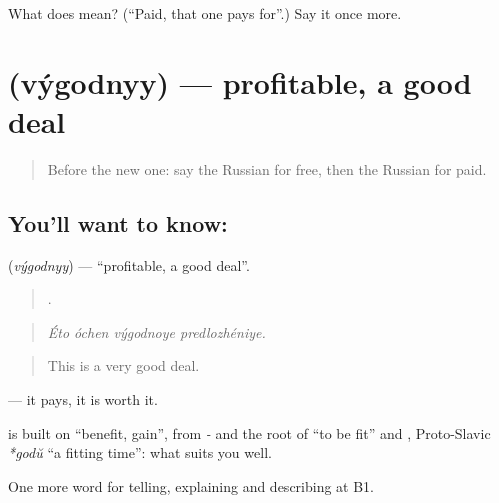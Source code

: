 \begin{tcolorbox}[breakable,colback=teal!4,colframe=teal!35!black,title={Before you move on}]
What does  mean? (\textquotedblleft{}Paid, that one pays for\textquotedblright{}.) Say it once more.
\end{tcolorbox}
\section[\texorpdfstring{\ru{выгодный} (výgodnyy)}{выгодный (výgodnyy)}]{ (výgodnyy) — profitable, a good deal}

\label{lesson:RU-C397-vygodnyy}



\begin{quote}
Before the new one: say the Russian for free, then the Russian for paid.
\end{quote}

\subsection*{You'll want to know: }
\textbf{} (\emph{výgodnyy}) — \textquotedblleft{}profitable, a good deal\textquotedblright{}.

\begin{quote}
   .
\end{quote}

\begin{quote}
\emph{Éto óchen výgodnoye predlozhéniye.}
\end{quote}

\begin{quote}
This is a very good deal.
\end{quote}

\emph{} — it pays, it is worth it.

\begin{cousinweb}
\textbf{} is built on \emph{} \textquotedblleft{}benefit, gain\textquotedblright{}, from \emph{-} and the root of \emph{} \textquotedblleft{}to be fit\textquotedblright{} and \emph{}, Proto-Slavic \emph{*godŭ} \textquotedblleft{}a fitting time\textquotedblright{}: what suits you well.
\end{cousinweb}

\begin{grammarlens}[title={What you've built}]
One more word for telling, explaining and describing at B1.
\end{grammarlens}

